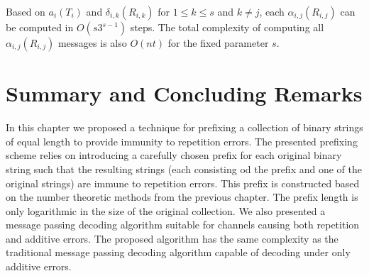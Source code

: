 Based on $a_i(T_i)$ and $\delta_{i,k}(R_{i,k})$ for $1 \leq k \leq
s$ and $k \neq j$, each $\alpha_{i,j}(R_{i,j})$ can be computed in
$O(s3^{s-1})$ steps. The total complexity of computing all
$\alpha_{i,j}(R_{i,j})$ messages is also $O(nt)$ for the fixed
parameter $s$.
\section{Summary and Concluding Remarks}

In this chapter we proposed a technique for prefixing a collection
of binary strings of equal length to provide immunity to repetition
errors. The presented  prefixing scheme  relies on introducing a
carefully chosen prefix for each original binary string such that
the resulting strings (each consisting od the prefix and one of the
original strings) are immune to repetition errors. This prefix is
constructed based on the number theoretic methods from the previous
chapter. The prefix length is only logarithmic in the size of the
original collection. We also presented a message passing decoding
algorithm suitable for channels causing both repetition and additive
errors. The proposed algorithm has the same complexity as the
traditional message passing decoding algorithm capable of decoding
under only additive errors.
